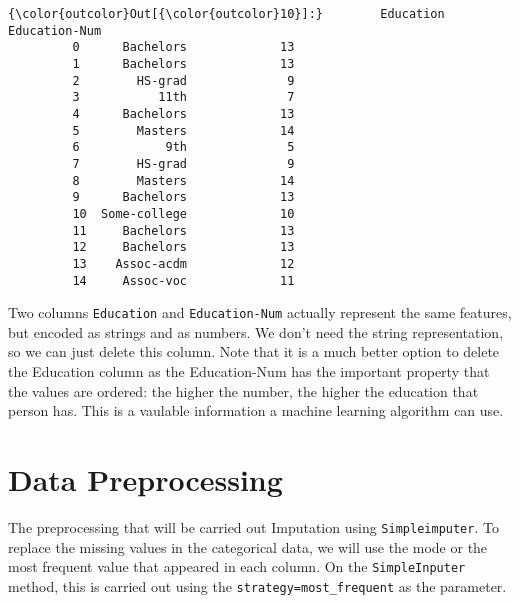 \documentclass{report}
\begin{document}
\begin{Verbatim}[commandchars=\\\{\}]
{\color{outcolor}Out[{\color{outcolor}10}]:}        Education  Education-Num
         0      Bachelors             13
         1      Bachelors             13
         2        HS-grad              9
         3           11th              7
         4      Bachelors             13
         5        Masters             14
         6            9th              5
         7        HS-grad              9
         8        Masters             14
         9      Bachelors             13
         10  Some-college             10
         11     Bachelors             13
         12     Bachelors             13
         13    Assoc-acdm             12
         14     Assoc-voc             11
\end{Verbatim}
            
Two columns \texttt{Education} and \texttt{Education-Num} actually
represent the same features, but encoded as strings and as numbers. We
don't need the string representation, so we can just delete this column.
Note that it is a much better option to delete the Education column as
the Education-Num has the important property that the values are
ordered: the higher the number, the higher the education that person
has. This is a vaulable information a machine learning algorithm can
use.

\section{Data Preprocessing}\label{data-preprocessing}

The preprocessing that will be carried out Imputation using
\texttt{Simpleimputer}. To replace the missing values in the categorical
data, we will use the mode or the most frequent value that appeared in
each column. On the \texttt{SimpleInputer} method, this is carried out
using the
\texttt{strategy=\textquotesingle{}most\_frequent\textquotesingle{}} as
the parameter.
\end{document}
